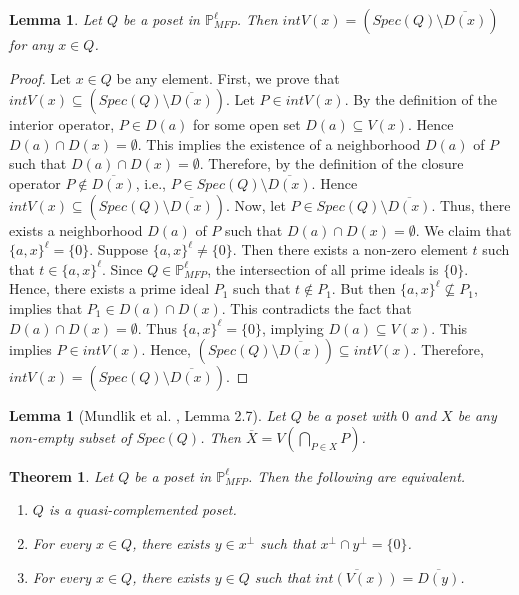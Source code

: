 \documentclass[10pt,one side,emlines]{amsart}
\newtheorem{lemma}[lem]{Lemma}
\newtheorem{thm}[lem]{Theorem}
\theoremstyle{definition}
\begin{document}
\begin{lemma}\label{2.9} 
	Let $Q$ be a poset in $\mathbb{P}^{\ell}_{MFP}$. Then $int V(x)=(Spec(Q)\setminus \overline{D(x)})$ for any $x\in Q$.
\end{lemma}
\begin{proof} 
	Let $x\in Q$ be any element. First, we prove that $int V(x)\subseteq (Spec(Q)\setminus \overline{D(x)})$. Let $P\in int V(x)$. By the definition of the interior operator, $P\in D(a)$ for some open set $D(a)\subseteq V(x)$. Hence $D(a)\cap D(x) = \emptyset$. This implies the existence of a neighborhood $D(a)$ of $P$ such that $D(a)\cap D(x)=\emptyset $. Therefore, by the definition of the closure operator $P\notin \overline{D(x)}$, i.e., $P\in Spec(Q)\setminus \overline{D(x)}$. Hence $int V(x) \subseteq (Spec(Q)\setminus \overline{D(x)})$. Now, let $P\in Spec(Q)\setminus \overline{D(x)}$. Thus, there exists a neighborhood $D(a)$ of $P$ such that $D(a)\cap D(x) = \emptyset $. We claim that $\{a,x\}^{\ell}=\{0\}$. Suppose $\{a,x\}^{\ell}\neq \{0\}$. Then there exists a non-zero element $t$ such that $t\in \{a, x\}^{\ell}$. Since $Q\in \mathbb{P}^{\ell}_{MFP}$, the intersection of all prime ideals is $\{0\}$. Hence, there exists a prime ideal $P_1$ such that $t\not \in P_1$. But then $\{a, x\}^{\ell}\not \subseteq P_1$, implies that $P_1\in D(a)\cap D(x)$.  This contradicts the fact that $D(a)\cap D(x)=\emptyset $. Thus $\{a, x\}^{\ell}=\{0\}$, implying $D(a)\subseteq V(x)$. This implies $P\in int V(x)$. Hence, $(Spec(Q)\setminus \overline{D(x)})\subseteq int V(x)$. Therefore, $int V(x)=(Spec(Q)\setminus \overline{D(x)}).$ 
\end{proof}

\begin{lemma}[Mundlik et al. \cite{MJH}, Lemma 2.7]\label{2.9'} 
	Let $Q$ be a poset with $0$ and $X$ be any non-empty subset of $Spec(Q)$. Then $\overline {X} = V(\bigcap _{P\in X} P)$.
\end{lemma}

\begin{thm}\label{1.5}
	Let $Q$ be a poset in $\mathbb{P}^{\ell}_{MFP}$. Then the following are equivalent. \begin{enumerate}\item $Q$ is a quasi-complemented poset. \item For every $x \in Q$, there exists $y \in x^{\perp}$ such that $x^{\perp} \cap y^{\perp}=\{0\}$. \item For every $x \in Q$, there exists $y \in Q$ such that $\overline{int(V(x))}=\overline{D(y)}$. 
\end{enumerate}\end{thm}
\end{document}
